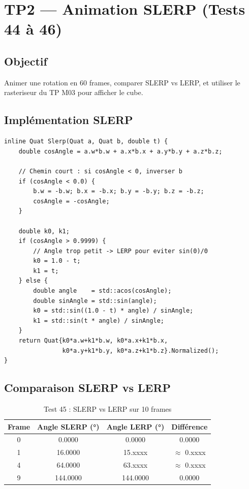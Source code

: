 \documentclass[12pt,a4paper]{report}
\begin{document}
\section{TP2 --- Animation SLERP (Tests 44 à 46)}

\subsection{Objectif}

Animer une rotation en 60 frames, comparer SLERP vs LERP,
et utiliser le rasteriseur du TP M03 pour afficher le cube.

\subsection{Implémentation SLERP}

\begin{lstlisting}[caption={Quat.h --- SLERP}]
inline Quat Slerp(Quat a, Quat b, double t) {
    double cosAngle = a.w*b.w + a.x*b.x + a.y*b.y + a.z*b.z;

    // Chemin court : si cosAngle < 0, inverser b
    if (cosAngle < 0.0) {
        b.w = -b.w; b.x = -b.x; b.y = -b.y; b.z = -b.z;
        cosAngle = -cosAngle;
    }

    double k0, k1;
    if (cosAngle > 0.9999) {
        // Angle trop petit -> LERP pour eviter sin(0)/0
        k0 = 1.0 - t;
        k1 = t;
    } else {
        double angle    = std::acos(cosAngle);
        double sinAngle = std::sin(angle);
        k0 = std::sin((1.0 - t) * angle) / sinAngle;
        k1 = std::sin(t * angle) / sinAngle;
    }
    return Quat{k0*a.w+k1*b.w, k0*a.x+k1*b.x,
                k0*a.y+k1*b.y, k0*a.z+k1*b.z}.Normalized();
}
\end{lstlisting}

\subsection{Comparaison SLERP vs LERP}

\begin{table}[H]
    \centering
    \begin{tabular}{|c|c|c|c|}
        \hline
        \textbf{Frame} & \textbf{Angle SLERP (°)} &
        \textbf{Angle LERP (°)} & \textbf{Différence} \\
        \hline
        0  & 0.0000   & 0.0000   & 0.0000 \\
        1  & 16.0000  & 15.xxxx  & $\approx$ 0.xxxx \\
        4  & 64.0000  & 63.xxxx  & $\approx$ 0.xxxx \\
        9  & 144.0000 & 144.0000 & 0.0000 \\
        \hline
    \end{tabular}
    \caption{Test 45 : SLERP vs LERP sur 10 frames}
\end{table}
\end{document}
